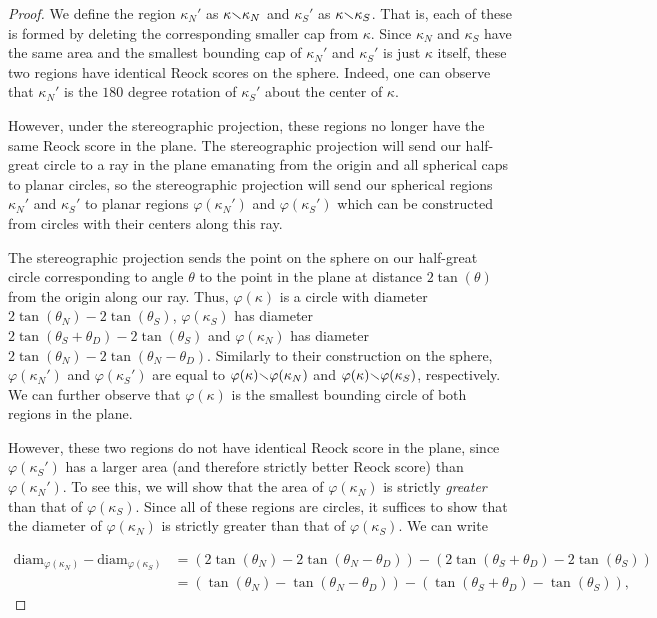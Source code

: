 \begin{proof}
  We define the region $\kappa_N'$ as $\kappa{\smallsetminus}\kappa_N$ and $\kappa_S'$ as $\kappa{\smallsetminus}\kappa_S$.  That is, each of these is formed by deleting the corresponding smaller cap from $\kappa$.  Since $\kappa_N$ and $\kappa_S$ have the same area and the smallest bounding cap of 
  $\kappa_N'$ and $\kappa_S'$ is just $\kappa$ itself, these two regions have identical Reock scores on the sphere.  
  Indeed, one can observe that $\kappa_N'$ is the 
  $180$ degree rotation of $\kappa_S'$ about the center of $\kappa$.
  
  However, under the stereographic projection, these regions no longer have the same Reock score in the plane.  The stereographic projection will send our half-great circle to a ray in the plane emanating from the origin and all spherical caps to planar circles, so the stereographic projection will send our spherical regions $\kappa_N'$ and $\kappa_S'$ to planar regions $\varphi(\kappa_N')$ and $\varphi(\kappa_S')$ which can be constructed from circles with their centers along this ray.
  
  The stereographic projection sends the point on the sphere on our half-great circle corresponding to angle $\theta$ to the point in the plane at distance $2\tan(\theta)$ from the origin along our ray.  Thus, $\varphi(\kappa)$ is a circle with diameter $2\tan(\theta_N)-2\tan(\theta_S)$, $\varphi(\kappa_S)$ has diameter $2\tan(\theta_S+\theta_D)-2\tan(\theta_S)$ and $\varphi(\kappa_N)$ has diameter $2\tan(\theta_N)-2\tan(\theta_N-\theta_D)$.  Similarly to their construction on the sphere, $\varphi(\kappa_N')$ and $\varphi(\kappa_S')$ are equal to $\varphi(\kappa){\smallsetminus} \varphi(\kappa_N)$ and $\varphi(\kappa){\smallsetminus} \varphi(\kappa_S)$, respectively.  We can further observe that $\varphi(\kappa)$ is the smallest bounding circle of both regions in the plane.
  
  However, these two regions do not have identical Reock score in the plane, since $\varphi(\kappa_S')$ has a larger area (and therefore strictly better Reock score) than $\varphi(\kappa_N')$.  To see this, we will show that the area of $\varphi(\kappa_N)$ is strictly \textit{greater} than that of $\varphi(\kappa_S)$. Since all of these regions are circles, it suffices to show that the diameter of $\varphi(\kappa_N)$ is strictly {greater} than that of $\varphi(\kappa_S)$.  We can write
  
  \begin{align*}
  \mathrm{diam}_{\varphi(\kappa_N)} - \mathrm{diam}_{\varphi(\kappa_S)} &= \left(2\tan(\theta_N) - 2\tan(\theta_N-\theta_D)\right) - \left( 2\tan(\theta_S+\theta_D) - 2\tan(\theta_S) \right)\\
  &= \left(\tan(\theta_N) - \tan(\theta_N-\theta_D)\right) - \left( \tan(\theta_S+\theta_D) - \tan(\theta_S) \right),
  \end{align*}
  

\end{proof}
